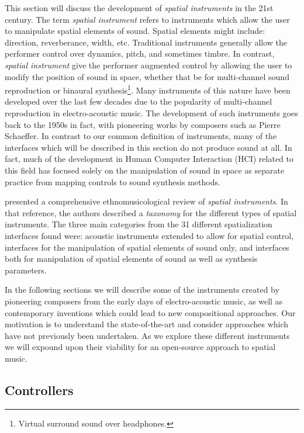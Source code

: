 This section will discuss the development of \textit{spatial instruments} in the 21st century. The term \textit{spatial instrument} refers to instruments which allow the user to manipulate spatial elements of sound. Spatial elements might include: direction, reverberance, width, etc. Traditional instruments generally allow the performer control over dynamics, pitch, and sometimes timbre. In contrast, \textit{spatial instrument} give the performer augmented control by allowing the user to modify the position of sound in space, whether that be for multi-channel sound reproduction or binaural synthesis\footnote{Virtual surround sound over headphones.}. 
Many instruments of this nature have been developed over the last few decades due to the popularity of multi-channel reproduction in electro-acoustic music. The development of such instruments goes back to the 1950s in fact, with pioneering works by composers such as Pierre Schaeffer. In contrast to our common definition of instruments, many of the interfaces which will be described in this section do not produce sound at all. In fact, much of the development in Human Computer Interaction (HCI) related to this field has focused solely on the manipulation of sound in space as separate practice from mapping controls to sound synthesis methods.  

\cite{pysiewicz2017instruments} presented a comprehensive ethnomusicological review of \textit{spatial instruments}. In that reference, the authors described a \textit{taxonomy} for the different types of spatial instruments. The three main categories from the 31 different spatialization interfaces found were: acoustic instruments extended to allow for spatial control, interfaces for the manipulation of spatial elements of sound only, and interfaces both for manipulation of spatial elements of sound as well as synthesis parameters. 

In the following sections we will describe some of the instruments created by pioneering composers from the early days of electro-acoustic music, as well as contemporary inventions which could lead to new compositional approaches. Our motivation is to understand the state-of-the-art and consider approaches which have not previously been undertaken. As we explore these different instruments we will expound upon their viability for an open-source approach to spatial music. 

\subsection{Controllers}
